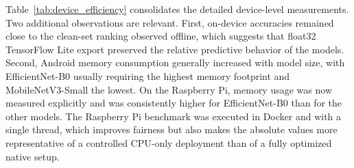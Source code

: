 \documentclass[runningheads]{llncs}
\begin{document}
Table~\ref{tab:device_efficiency} consolidates the detailed device-level measurements. Two additional observations are relevant. First, on-device accuracies remained close to the clean-set ranking observed offline, which suggests that float32 TensorFlow Lite export preserved the relative predictive behavior of the models. Second, Android memory consumption generally increased with model size, with EfficientNet-B0 usually requiring the highest memory footprint and MobileNetV3-Small the lowest. On the Raspberry Pi, memory usage was now measured explicitly and was consistently higher for EfficientNet-B0 than for the other models. The Raspberry Pi benchmark was executed in Docker and with a single thread, which improves fairness but also makes the absolute values more representative of a controlled CPU-only deployment than of a fully optimized native setup.
\end{document}
